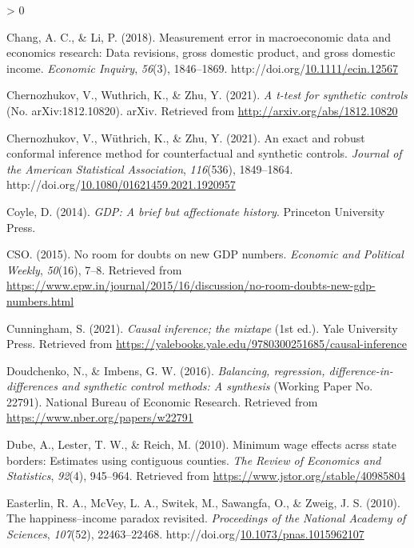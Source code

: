 \documentclass[12pt,nobind, a4paper]{reedthesis}
\newlength{\cslhangindent}
\newenvironment{CSLReferences}[2] %
{%
	\setlength{\parindent}{0pt}
	\ifodd #1 \everypar{\setlength{\hangindent}{\cslhangindent}}\ignorespaces\fi
	\ifnum #2 > 0
	\setlength{\parskip}{#2\baselineskip}
	\fi
}%
{}
\begin{document}
\begin{CSLReferences}{1}{0}
 \leavevmode\hypertarget{ref-chang_measurement_2018}{}%
 Chang, A. C., \& Li, P. (2018). Measurement error in macroeconomic data and economics research: Data revisions, gross domestic product, and gross domestic income. \emph{Economic Inquiry}, \emph{56}(3), 1846--1869. http://doi.org/\href{https://doi.org/10.1111/ecin.12567}{10.1111/ecin.12567}

 \leavevmode\hypertarget{ref-chernozhukov_t-test_2021}{}%
 Chernozhukov, V., Wuthrich, K., \& Zhu, Y. (2021). \emph{A t-test for synthetic controls} (No. {arXiv}:1812.10820). {arXiv}. Retrieved from \url{http://arxiv.org/abs/1812.10820}

 \leavevmode\hypertarget{ref-chernozhukov_exact_2021}{}%
 Chernozhukov, V., Wüthrich, K., \& Zhu, Y. (2021). An exact and robust conformal inference method for counterfactual and synthetic controls. \emph{Journal of the American Statistical Association}, \emph{116}(536), 1849--1864. http://doi.org/\href{https://doi.org/10.1080/01621459.2021.1920957}{10.1080/01621459.2021.1920957}

 \leavevmode\hypertarget{ref-coyle_gdp_2014}{}%
 Coyle, D. (2014). \emph{{GDP}: A brief but affectionate history}. Princeton University Press.

 \leavevmode\hypertarget{ref-cso_no_2015}{}%
 CSO. (2015). No room for doubts on new {GDP} numbers. \emph{Economic and Political Weekly}, \emph{50}(16), 7--8. Retrieved from \url{https://www.epw.in/journal/2015/16/discussion/no-room-doubts-new-gdp-numbers.html}

 \leavevmode\hypertarget{ref-cunningham_causal_2021}{}%
 Cunningham, S. (2021). \emph{Causal inference; the mixtape} (1st ed.). Yale University Press. Retrieved from \url{https://yalebooks.yale.edu/9780300251685/causal-inference}

 \leavevmode\hypertarget{ref-doudchenko_balancing_2016}{}%
 Doudchenko, N., \& Imbens, G. W. (2016). \emph{Balancing, regression, difference-in-differences and synthetic control methods: A synthesis} (Working Paper No. 22791). National Bureau of Economic Research. Retrieved from \url{https://www.nber.org/papers/w22791}

 \leavevmode\hypertarget{ref-dube_minimum_2010}{}%
 Dube, A., Lester, T. W., \& Reich, M. (2010). Minimum wage effects acrss state borders: Estimates using contiguous counties. \emph{The Review of Economics and Statistics}, \emph{92}(4), 945--964. Retrieved from \url{https://www.jstor.org/stable/40985804}

 \leavevmode\hypertarget{ref-easterlin_happinessincome_2010}{}%
 Easterlin, R. A., McVey, L. A., Switek, M., Sawangfa, O., \& Zweig, J. S. (2010). The happiness--income paradox revisited. \emph{Proceedings of the National Academy of Sciences}, \emph{107}(52), 22463--22468. http://doi.org/\href{https://doi.org/10.1073/pnas.1015962107}{10.1073/pnas.1015962107}


\end{CSLReferences}
\end{document}
